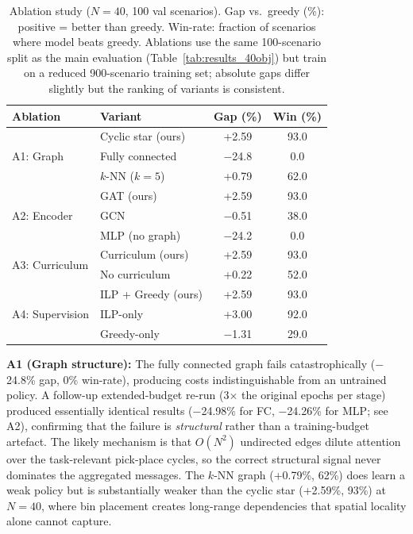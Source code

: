 \documentclass[conference]{IEEEtran}
\begin{document}
\begin{table}[htbp]
\caption{Ablation study ($N{=}40$, 100 val scenarios). Gap vs.\ greedy (\%): positive = better than greedy. Win-rate: fraction of scenarios where model beats greedy. Ablations use the same 100-scenario split as the main evaluation (Table~\ref{tab:results_40obj}) but train on a reduced 900-scenario training set; absolute gaps differ slightly but the ranking of variants is consistent.}
\label{tab:ablations}
\centering
\begin{tabular}{@{}llcc@{}}
\toprule
\textbf{Ablation} & \textbf{Variant} & \textbf{Gap (\%)} & \textbf{Win (\%)} \\
\midrule
\multirow{3}{*}{A1: Graph}
    & Cyclic star (ours) & +2.59 & 93.0 \\
    & Fully connected & $-$24.8 & 0.0 \\
    & $k$-NN ($k{=}5$) & +0.79 & 62.0 \\
\cmidrule(l){2-4}
\multirow{3}{*}{A2: Encoder}
    & GAT (ours) & +2.59 & 93.0 \\
    & GCN & $-$0.51 & 38.0 \\
    & MLP (no graph) & $-$24.2 & 0.0 \\
\cmidrule(l){2-4}
\multirow{2}{*}{A3: Curriculum}
    & Curriculum (ours) & +2.59 & 93.0 \\
    & No curriculum & +0.22 & 52.0 \\
\cmidrule(l){2-4}
\multirow{3}{*}{A4: Supervision}
    & ILP + Greedy (ours) & +2.59 & 93.0 \\
    & ILP-only & +3.00 & 92.0 \\
    & Greedy-only & $-$1.31 & 29.0 \\
\bottomrule
\end{tabular}
\end{table}

\textbf{A1 (Graph structure):} The fully connected graph fails catastrophically ($-$24.8\% gap, 0\% win-rate), producing costs indistinguishable from an untrained policy. A follow-up extended-budget re-run (3$\times$ the original epochs per stage) produced essentially identical results ($-$24.98\% for FC, $-$24.26\% for MLP; see A2), confirming that the failure is \emph{structural} rather than a training-budget artefact. The likely mechanism is that $O(N^2)$ undirected edges dilute attention over the task-relevant pick-place cycles, so the correct structural signal never dominates the aggregated messages. The $k$-NN graph (+0.79\%, 62\%) does learn a weak policy but is substantially weaker than the cyclic star (+2.59\%, 93\%) at $N{=}40$, where bin placement creates long-range dependencies that spatial locality alone cannot capture.
\end{document}
